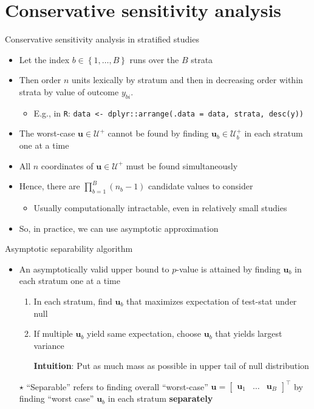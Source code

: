 \documentclass[table, xcolor={dvipsnames}, 9pt]{beamer}
\theoremstyle{newstyle}
\begin{document}
\section{Conservative sensitivity analysis}
\begin{frame}{Conservative sensitivity analysis in stratified studies}
\vfill
\begin{itemize} \vfill
\item Let the index $b \in \left\{1, \ldots, B\right\}$ runs over the $B$ strata \vfill
\item  Then order $n$ units lexically by stratum and then in decreasing order within strata by value of outcome $y_{bi}$.
\begin{itemize} \vfill
\item  E.g., in \texttt{R}: \texttt{data <- dplyr::arrange(.data = data, strata, desc(y))} \vfill
\end{itemize}	 \vfill
\item  The worst-case $\mathbf{u} \in \mathcal{U}^+$ cannot be found by finding $\mathbf{u}_b \in \mathcal{U}_b^+$ in each stratum one at a time \vfill
\item  All $n$ coordinates of $\mathbf{u} \in \mathcal{U}^+$ must be found simultaneously \vfill
\item  Hence, there are $\prod \limits_{b = 1}^B \left(n_b - 1\right)$ candidate values to consider \vfill
\begin{itemize} \vfill
\item  Usually computationally intractable, even in relatively small studies  \vfill
\end{itemize} \vfill
\item So, in practice, we can use asymptotic approximation \\ \citep{gastwirthetal2000,rosenbaum2018} \vfill
\end{itemize} \vfill
\end{frame}
\begin{frame}{Asymptotic separability algorithm}
\vfill
\begin{itemize} \vfill
\item An asymptotically valid upper bound to $p$-value is attained by finding $\bm{u}_b$ in each stratum one at a time \citep{gastwirthetal2000} \vfill
\begin{enumerate} \vfill
\item In each stratum, find $\bm{u}_b$ that maximizes expectation of test-stat under null \vfill
\item If multiple $\bm{u}_b$ yield same expectation, choose $\bm{u}_b$ that yields largest variance \vfill
\item[] \textbf{Intuition}: Put as much mass as possible in upper tail of null distribution \vfill
\end{enumerate} \vfill
\item[$\star$] ``Separable'' refers to finding overall ``worst-case'' $\bm{u} = \begin{bmatrix} \bm{u}_1 & \ldots & \bm{u}_B \end{bmatrix}^{\top}$ by finding ``worst case'' $\bm{u}_b$ in each stratum \textbf{separately} \vfill
\end{itemize} \vfill
\end{frame}
\end{document}
